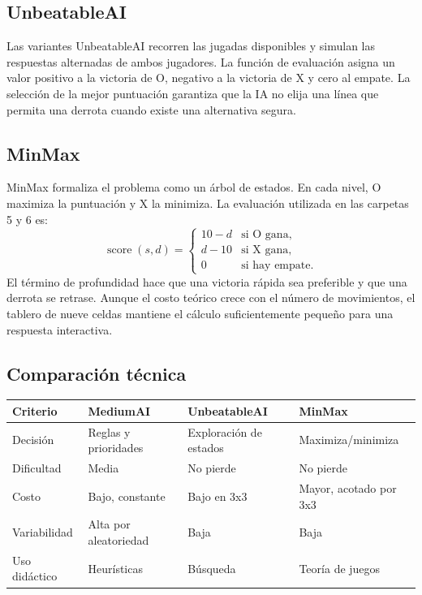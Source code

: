 \documentclass[stu,a4paper,12pt,floatsintext]{apa7}
\begin{document}
\subsection{UnbeatableAI}
Las variantes UnbeatableAI recorren las jugadas disponibles y simulan las
respuestas alternadas de ambos jugadores. La función de evaluación asigna un
valor positivo a la victoria de O, negativo a la victoria de X y cero al
empate. La selección de la mejor puntuación garantiza que la IA no elija una
línea que permita una derrota cuando existe una alternativa segura.

\subsection{MinMax}
MinMax formaliza el problema como un árbol de estados. En cada nivel, O
maximiza la puntuación y X la minimiza. La evaluación utilizada en las
carpetas 5 y 6 es:
\[
  \operatorname{score}(s,d)=
  \begin{cases}
  10-d & \text{si O gana},\\
  d-10 & \text{si X gana},\\
  0 & \text{si hay empate}.
  \end{cases}
\]
El término de profundidad hace que una victoria rápida sea preferible y que
una derrota se retrase. Aunque el costo teórico crece con el número de
movimientos, el tablero de nueve celdas mantiene el cálculo suficientemente
pequeño para una respuesta interactiva.

\subsection{Comparación técnica}
\begin{longtable}{p{}p{}p{}p{}}
\toprule
\textbf{Criterio} & \textbf{MediumAI} & \textbf{UnbeatableAI} & \textbf{MinMax}\\
\midrule
Decisión & Reglas y prioridades & Exploración de estados & Maximiza/minimiza\\
Dificultad & Media & No pierde & No pierde\\
Costo & Bajo, constante & Bajo en 3x3 & Mayor, acotado por 3x3\\
Variabilidad & Alta por aleatoriedad & Baja & Baja\\
Uso didáctico & Heurísticas & Búsqueda & Teoría de juegos\\
\bottomrule
\end{longtable}
\end{document}

